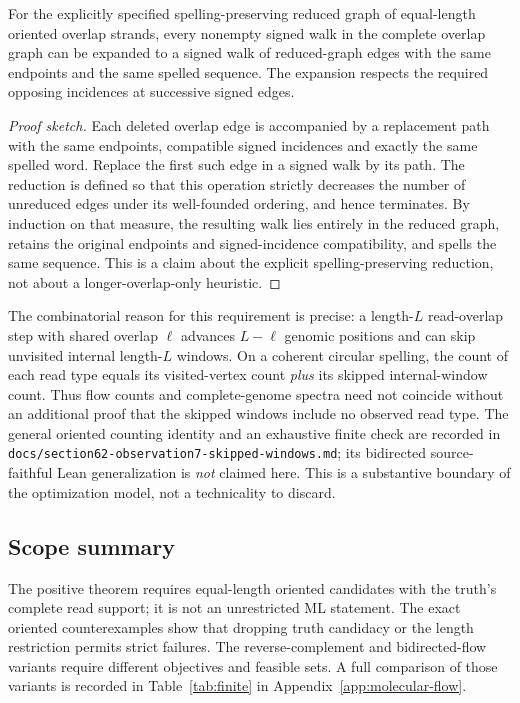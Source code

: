 \begin{theorem}
\label{thm:global-spelling}
For the explicitly specified spelling-preserving reduced graph
of equal-length oriented overlap strands, every nonempty signed
walk in the complete overlap
graph can be expanded to a signed walk of reduced-graph edges with
the same endpoints and the same spelled sequence. The expansion
respects the required opposing incidences at successive signed edges.
\end{theorem}
\begin{proof}[Proof sketch]
Each deleted overlap edge is accompanied by a replacement
path with the same endpoints, compatible signed incidences
and exactly the same spelled word. Replace the first such
edge in a signed walk by its path. The reduction is defined
so that this operation strictly decreases the number of
unreduced edges under its well-founded ordering, and hence
terminates. By induction on that measure, the resulting
walk lies entirely in the reduced graph, retains the
original endpoints and signed-incidence compatibility, and
spells the same sequence. This is a claim about the
explicit spelling-preserving reduction, not about a
longer-overlap-only heuristic.
\end{proof}

The combinatorial reason for this requirement is precise: a
length-$L$ read-overlap step with shared overlap $\ell$ advances
$L-\ell$ genomic positions and can skip unvisited internal
length-$L$ windows. On a coherent circular spelling, the count of
each read type equals its visited-vertex count \emph{plus} its
skipped internal-window count. Thus flow counts and complete-genome
spectra need not coincide without an additional proof that the
skipped windows include no observed read type. The general oriented
counting identity and an exhaustive finite check are recorded in
\texttt{docs/section62-observation7-skipped-windows.md}; its
bidirected source-faithful Lean generalization is \emph{not} claimed
here. This is a substantive boundary of the optimization model, not a
technicality to discard.

\subsection{Scope summary}

The positive theorem requires equal-length oriented candidates with
the truth's complete read support; it is not an unrestricted ML
statement. The exact oriented counterexamples show that dropping
truth candidacy or the length restriction permits strict failures.
The reverse-complement and bidirected-flow variants require
different objectives and feasible sets. A full comparison of those
variants is recorded in Table~\ref{tab:finite} in
Appendix~\ref{app:molecular-flow}.
